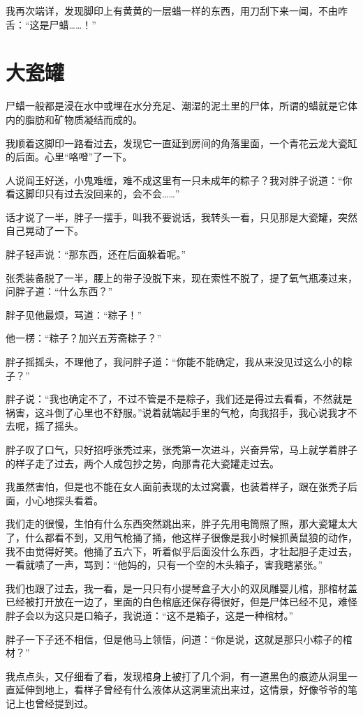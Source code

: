 我再次端详，发现脚印上有黄黄的一层蜡一样的东西，用刀刮下来一闻，不由咋舌：“这是尸蜡……！”

\chapter{大瓷罐}

尸蜡一般都是浸在水中或埋在水分充足、潮湿的泥土里的尸体，所谓的蜡就是它体内的脂肪和矿物质凝结而成的。

我顺着这脚印一路看过去，发现它一直延到房间的角落里面，一个青花云龙大瓷缸的后面。心里“咯噔”了一下。

人说阎王好送，小鬼难缠，难不成这里有一只未成年的粽子？我对胖子说道：“你看这脚印只有过去没回来的，会不会……”

话才说了一半，胖子一摆手，叫我不要说话，我转头一看，只见那是大瓷罐，突然自己晃动了一下。

胖子轻声说：“那东西，还在后面躲着呢。”

张秃装备脱了一半，腰上的带子没脱下来，现在索性不脱了，提了氧气瓶凑过来，问胖子道：“什么东西？”

胖子见他最烦，骂道：“粽子！”

他一楞：“粽子？加兴五芳斋粽子？”

胖子摇摇头，不理他了，我问胖子道：“你能不能确定，我从来没见过这么小的粽子？”

胖子说：“我也确定不了，不过不管是不是粽子，我们还是得过去看看，不然就是祸害，这斗倒了心里也不舒服。”说着就端起手里的气枪，向我招手，我心说我才不去呢，摇了摇头。

胖子叹了口气，只好招呼张秃过来，张秃第一次进斗，兴奋异常，马上就学着胖子的样子走了过去，两个人成包抄之势，向那青花大瓷罐走过去。

我虽然害怕，但是也不能在女人面前表现的太过窝囊，也装着样子，跟在张秃子后面，小心地探头看着。

我们走的很慢，生怕有什么东西突然跳出来，胖子先用电筒照了照，那大瓷罐太大了，什么都看不到，又用气枪捅了捅，他这样子很像是我小时候抓黄鼠狼的动作，我不由觉得好笑。他捅了五六下，听着似乎后面没什么东西，才壮起胆子走过去，一看就啧了一声，骂到：“他妈的，只有一个空的木头箱子，害我瞎紧张。”

我们也跟了过去，我一看，是一只只有小提琴盒子大小的双凤雕婴儿棺，那棺材盖已经被打开放在一边了，里面的白色棺底还保存得很好，但是尸体已经不见，难怪胖子会以为这只是口箱子，我说道：“这不是箱子，这是一种棺材。”

胖子一下子还不相信，但是他马上领悟，问道：“你是说，这就是那只小粽子的棺材？”

我点点头，又仔细看了看，发现棺身上被打了几个洞，有一道黑色的痕迹从洞里一直延伸到地上，看样子曾经有什么液体从这洞里流出来过，这情景，好像爷爷的笔记上也曾经提到过。

